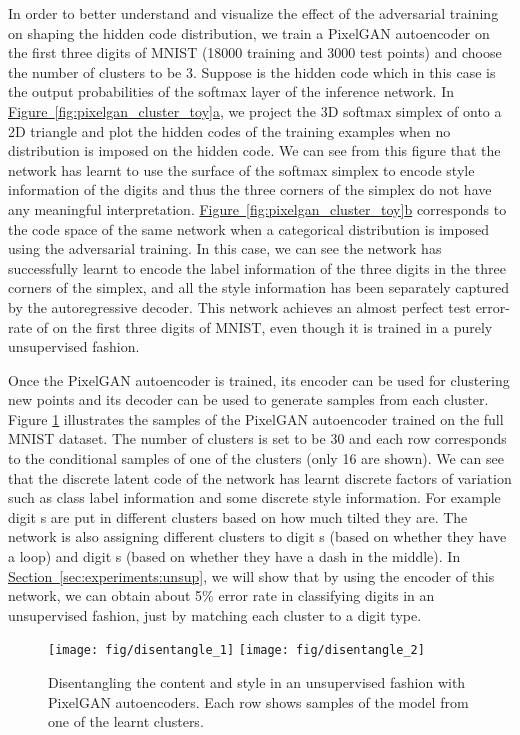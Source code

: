 \documentclass{article}
\newcommand{\mysec}[1]{\hyperref[sec:#1]{Section~\ref*{sec:#1}}}
\newcommand{\myfigg}[2]{\hyperref[fig:#1]{Figure~\ref*{fig:#1}#2}}
\begin{document}
In order to better understand and visualize the effect of the adversarial training on shaping the hidden code distribution, we train a PixelGAN autoencoder on the first three digits of MNIST (18000 training and 3000 test points) and choose the number of clusters to be 3. Suppose  is the hidden code which in this case is the output probabilities of the softmax layer of the inference network. In \myfigg{pixelgan_cluster_toy}{a}, we project the 3D softmax simplex of  onto a 2D triangle and plot the hidden codes of the training examples when no distribution is imposed on the hidden code. We can see from this figure that the network has learnt to use the surface of the softmax simplex to encode style information of the digits and thus the three corners of the simplex do not have any meaningful interpretation. \myfigg{pixelgan_cluster_toy}{b} corresponds to the code space of the same network when a categorical distribution is imposed using the adversarial training. In this case, we can see the network has successfully learnt to encode the label information of the three digits in the three corners of the simplex, and all the style information has been separately captured by the autoregressive decoder. This network achieves an almost perfect test error-rate of  on the first three digits of MNIST, even though it is trained in a purely unsupervised fashion.

Once the PixelGAN autoencoder is trained, its encoder can be used for clustering new points and its decoder can be used to generate samples from each cluster. Figure \ref{fig:pixelgan_cluster} illustrates the samples of the PixelGAN autoencoder trained on the full MNIST dataset. The number of clusters is set to be 30 and each row corresponds to the conditional samples of one of the clusters (only 16 are shown). We can see that the discrete latent code of the network has learnt discrete factors of variation such as class label information and some discrete style information. For example digit s are put in different clusters based on how much tilted they are. The network is also assigning different clusters to digit s (based on whether they have a loop) and digit s (based on whether they have a dash in the middle). In \mysec{experiments:unsup}, we will show that by using the encoder of this network, we can obtain about 5\% error rate in classifying digits in an unsupervised fashion, just by matching each cluster to a digit type.


\begin{figure}[t]
\centering
\texttt{[image: fig/disentangle\_1]}
\hspace{.3cm}
\texttt{[image: fig/disentangle\_2]}
\vspace{-.1cm}
\caption{\label{fig:pixelgan_cluster}Disentangling the content and style in an unsupervised fashion with PixelGAN autoencoders. Each row shows samples of the model from one of the learnt clusters.}
\end{figure}
\end{document}
